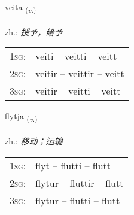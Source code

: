\documentclass[frontgrid, backgrid]{flacards}\usepackage[]{graphicx}\usepackage[]{xcolor}
\begin{document}
{veita \small{\textsubscript{(\textit{v.})}} \\[1ex] %
\textphonetic{[veiːta]} \\
zh.: \emph{授予，给予} \\  [2ex]
\renewcommand*{\arraystretch}{0.8}
\begin{tabular}{p{1cm}l}
\textsc{1sg}: & veiti -- veitti -- veitt \\ 
\textsc{2sg}: & veitir -- veittir -- veitt \\ 
\textsc{3sg}: & veitir -- veitti -- veitt \\ 
\end{tabular}
}

\renewcommand{\flhead}{\vskip5pt \fboxsep=0pt {\small\bfseries\footnotesize Sagnorð | 动词}}
\renewcommand{\fcfoot}{\vskip5pt \fboxsep=0pt \hspace{2pt}{\small\bfseries\footnotesize 1K}}

\renewcommand{\blhead}{\vskip5pt {\small\bfseries\footnotesize Sagnorð | 动词 }}
\renewcommand{\bcfoot}{\vskip5pt \hspace{2pt}{\small\bfseries\footnotesize 1K}}


{flytja \small{\textsubscript{(\textit{v.})}} \\[1ex] %
\textphonetic{[flɪːtja]} \\
zh.: \emph{移动；运输} \\  [2ex]
\renewcommand*{\arraystretch}{0.8}
\begin{tabular}{p{1cm}l}
\textsc{1sg}: & flyt -- flutti -- flutt \\ 
\textsc{2sg}: & flytur -- fluttir -- flutt \\ 
\textsc{3sg}: & flytur -- flutti -- flutt \\ 
\end{tabular}
}

\renewcommand{\flhead}{\vskip5pt \fboxsep=0pt {\small\bfseries\footnotesize Nafnorð | 名词}}
\renewcommand{\fcfoot}{\vskip5pt \fboxsep=0pt \hspace{2pt}{\small\bfseries\footnotesize 1K}}
\end{document}
